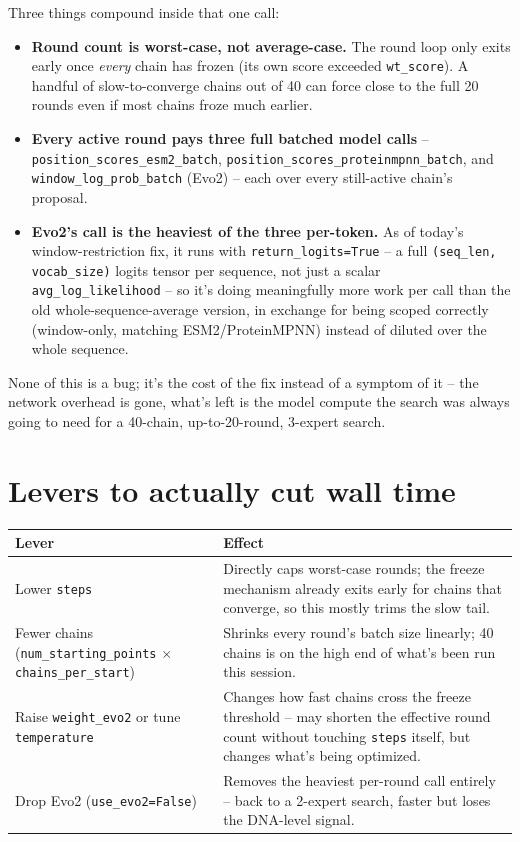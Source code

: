 \documentclass[11pt]{article}
\begin{document}
Three things compound inside that one call:

\begin{itemize}
  \item \textbf{Round count is worst-case, not average-case.} The round loop
    only exits early once \emph{every} chain has frozen (its own score
    exceeded \texttt{wt\_score}). A handful of slow-to-converge chains out of
    40 can force close to the full 20 rounds even if most chains froze
    much earlier.
  \item \textbf{Every active round pays three full batched model calls} --
    \texttt{position\_scores\_esm2\_batch}, \texttt{position\_scores\_proteinmpnn\_batch},
    and \texttt{window\_log\_prob\_batch} (Evo2) -- each over every still-active
    chain's proposal.
  \item \textbf{Evo2's call is the heaviest of the three per-token.} As of
    today's window-restriction fix, it runs with \texttt{return\_logits=True} --
    a full \texttt{(seq\_len, vocab\_size)} logits tensor per sequence, not
    just a scalar \texttt{avg\_log\_likelihood} -- so it's doing meaningfully
    more work per call than the old whole-sequence-average version, in
    exchange for being scoped correctly (window-only, matching ESM2/ProteinMPNN)
    instead of diluted over the whole sequence.
\end{itemize}

None of this is a bug; it's the cost of the fix instead of a symptom of
it -- the network overhead is gone, what's left is the model compute the
search was always going to need for a 40-chain, up-to-20-round, 3-expert
search.

\section{Levers to actually cut wall time}

\begin{center}
\begin{tabular}{@{}lp{}@{}}
\toprule
Lever & Effect \\
\midrule
Lower \texttt{steps} & Directly caps worst-case rounds; the freeze mechanism
  already exits early for chains that converge, so this mostly trims the
  slow tail. \\
Fewer chains (\texttt{num\_starting\_points} $\times$ \texttt{chains\_per\_start}) &
  Shrinks every round's batch size linearly; 40 chains is on the high end of
  what's been run this session. \\
Raise \texttt{weight\_evo2} or tune \texttt{temperature} & Changes how fast
  chains cross the freeze threshold -- may shorten the effective round count
  without touching \texttt{steps} itself, but changes what's being optimized. \\
Drop Evo2 (\texttt{use\_evo2=False}) & Removes the heaviest per-round call
  entirely -- back to a 2-expert search, faster but loses the DNA-level
  signal. \\
\bottomrule
\end{tabular}
\end{center}
\end{document}
